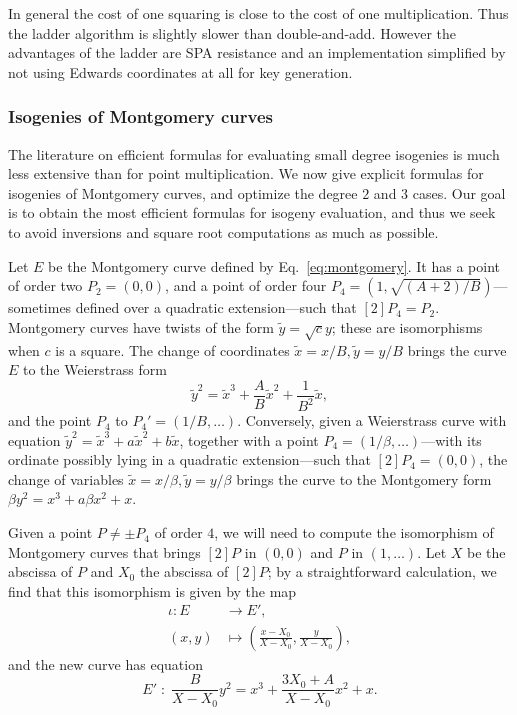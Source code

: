 In general the cost of one squaring is close to the cost of one
multiplication. Thus the ladder algorithm is slightly slower than
double-and-add. However the advantages of the ladder are SPA
resistance and an implementation simplified by not using Edwards
coordinates at all for key generation.

\subsubsection{Isogenies of Montgomery curves}\label{sssec:montgomery-isogeny}

The literature on efficient formulas for evaluating small degree
isogenies is much less extensive than for point multiplication. We now
give explicit formulas for isogenies of Montgomery curves, and
optimize the degree $2$ and $3$ cases. Our goal is to obtain the most
efficient formulas for isogeny evaluation, and thus we seek to avoid
inversions and square root computations as much as possible.

Let $E$ be the Montgomery curve defined by Eq.~\eqref{eq:montgomery}.
It has a point of order two $P_2=(0,0)$, and a point of order four
$P_4=(1,\sqrt{(A+2)/B})$---sometimes defined over a quadratic
extension---such that $[2]P_4=P_2$. Montgomery curves have twists of
the form $\tilde{y}=\sqrt{c}y$; these are isomorphisms when $c$ is a
square. The change of coordinates $\tilde{x}=x/B, \tilde{y}=y/B$
brings the curve $E$ to the Weierstrass form
\begin{equation}
  \label{eq:twisted}
  \tilde{y}^2 = \tilde{x}^3 + \frac{A}{B}\tilde{x}^2 + \frac{1}{B^2}\tilde{x},
\end{equation}
and the point $P_4$ to $P_4'=(1/B,\ldots)$. Conversely, given a
Weierstrass curve with equation
$\tilde{y}^2=\tilde{x}^3+a\tilde{x}^2+b\tilde{x}$, together with a
point $P_4=(1/\beta,\ldots)$---with its ordinate possibly lying in a
quadratic extension---such that $[2]P_4=(0,0)$, the change of
variables $\tilde{x}=x/\beta, \tilde{y}=y/\beta$ brings the curve to
the Montgomery form $\beta y^2=x^3+a\beta x^2 + x$.

Given a point $P\ne\pm P_4$ of order $4$, we will need to compute the
isomorphism of Montgomery curves that brings $[2]P$ in $(0,0)$ and $P$
in $(1,\ldots)$. Let $X$ be the abscissa of $P$ and $X_0$ the abscissa
of $[2]P$; by a straightforward calculation, we find that this
isomorphism is given by the map
\begin{equation}
  \label{eq:isomorphism}
  \begin{aligned}
    \iota : E &\to E',\\
    (x,y) &\mapsto \left(\frac{x-X_0}{X-X_0}, \frac{y}{X-X_0}\right),
  \end{aligned}
\end{equation}
and the new curve has equation
\begin{equation*}
  E' \;:\; \frac{B}{X-X_0}y^2 = x^3 + \frac{3X_0 + A}{X-X_0} x^2 + x.
\end{equation*}

